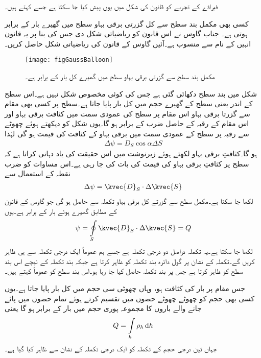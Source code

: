 فیراڈے کے تجربے کو قانون کی شکل میں یوں پیش کیا جا سکتا ہے جسے  کہتے ہیں۔

کسی بھی مکمل بند سطح سے  کل گزرتی برقی بہاو سطح میں گھیرے بار کے برابر ہوتی ہے۔
جناب گاوس نے اس قانون کو ریاضیاتی شکل دی جس کی بنا پر یہ قانون انہیں کے نام سے منسوب ہے۔آئیں گاوس کے قانون کی ریاضیاتی شکل حاصل کریں۔
\begin{figure}
\centering
\texttt{[image: figGaussBalloon]}
\caption{مکمل بند سطح سے گزرتی برقی بہاو سطح میں گھیرے کل بار کے برابر ہے۔}
\label{شکل_گاوس_کا_قانون}
\end{figure}

شکل  میں  بند سطح دکھائی گئی ہے جس کی کوئی مخصوص شکل نہیں ہے۔اس سطح کے اندر یعنی سطح کے گھیرے حجم میں کل  بار  پایا جاتا ہے۔سطح پر کسی بھی مقام سے گزرتا برقی بہاو اس مقام پر سطح کی عمودی سمت میں کثافت برقی بہاو اور اس مقام کے رقبہ کے حاصل ضرب کے برابر ہو گا۔یوں شکل کو دیکھتے ہوئے  چھوٹے سے رقبہ  پر سطح کے عمودی سمت میں برقی بہاو کے کثافت  کی قیمت  ہو گی لہٰذا
\begin{align*}
\Delta \psi =D_S \cos \alpha  \Delta S
\end{align*}
ہو گا۔کثافتِ برقی بہاو  لکھتے ہوئے زیرنوشت میں  اس حقیقت کی یاد دہانی کراتا ہے کہ سطح پر کثافتِ برقی بہاو کی قیمت کی بات کی جا رہی ہے۔اس مساوات کو ضرب نقطہ کے استعمال سے
\begin{align*}
\Delta \psi =\kvec{D}_S \cdot \Delta \kvec{S}
\end{align*}
لکھا جا سکتا ہے۔مکمل سطح سے گزرتے کل برقی بہاو تکملہ سے حاصل ہو گی جو گاوس کے قانون کے مطابق گھیرے ہوئے بار  کے برابر ہے۔یوں
\begin{align}\label{مساوات_گاوس_قانون_گاوس_بنیادی_شکل}
\psi=\oint\limits_{S} \kvec{D}_S \cdot \Delta \kvec{S}=Q
\end{align}
لکھا جا سکتا ہے۔یہ تکملہ دراصل دو درجی  تکملہ ہے جسے ہم عموماً ایک درجی تکملہ سے ہی ظاہر کریں گے۔تکملہ کے نشان پر گول دائرہ بند تکملہ کو ظاہر کرتا ہے جبکہ بند تکملہ  کے  نیچے  اس بند سطح کو ظاہر کرتا ہے جس پر بند تکملہ حاصل کیا جا رہا ہو۔اس بند سطح کو عموماً  کہتے ہیں۔

جس مقام پر بار کی کثافت  ہو، وہاں  چھوٹی سی حجم  میں کل بار   پایا جاتا ہے۔یوں کسی بھی حجم کو چھوٹے چھوٹے حصوں میں تقسیم کرتے ہوئے تمام حصوں میں پائے جانے والے باروں کا مجموعہ پوری حجم میں بار کے برابر ہو گا یعنی
\begin{align}\label{مساوات_گاوس_کل_حجمی_بار}
Q=\int\limits_{h} \rho_h \dif h
 \end{align}
جہاں تین درجی حجم کے تکملہ کو ایک درجی تکملہ کے نشان سے ظاہر کیا گیا ہے۔

